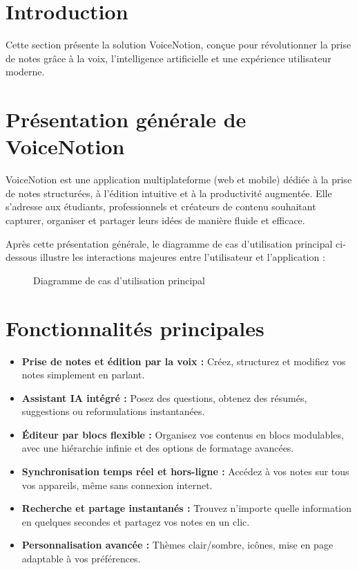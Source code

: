 
\section*{Introduction}
Cette section présente la solution VoiceNotion, conçue pour révolutionner la prise de notes grâce à la voix, l’intelligence artificielle et une expérience utilisateur moderne.

\section{Présentation générale de VoiceNotion}
VoiceNotion est une application multiplateforme (web et mobile) dédiée à la prise de notes structurées, à l’édition intuitive et à la productivité augmentée. Elle s’adresse aux étudiants, professionnels et créateurs de contenu souhaitant capturer, organiser et partager leurs idées de manière fluide et efficace.

Après cette présentation générale, le diagramme de cas d’utilisation principal ci-dessous illustre les interactions majeures entre l’utilisateur et l’application :

\begin{figure}[H]
    \centering
    \caption{Diagramme de cas d’utilisation principal}
    \label{fig:use-case}
\end{figure}

\section{Fonctionnalités principales}
\begin{itemize}
    \item \textbf{Prise de notes et édition par la voix :} Créez, structurez et modifiez vos notes simplement en parlant.
    \item \textbf{Assistant IA intégré :} Posez des questions, obtenez des résumés, suggestions ou reformulations instantanées.
    \item \textbf{Éditeur par blocs flexible :} Organisez vos contenus en blocs modulables, avec une hiérarchie infinie et des options de formatage avancées.
    \item \textbf{Synchronisation temps réel et hors-ligne :} Accédez à vos notes sur tous vos appareils, même sans connexion internet.
    \item \textbf{Recherche et partage instantanés :} Trouvez n’importe quelle information en quelques secondes et partagez vos notes en un clic.
    \item \textbf{Personnalisation avancée :} Thèmes clair/sombre, icônes, mise en page adaptable à vos préférences.
\end{itemize}

